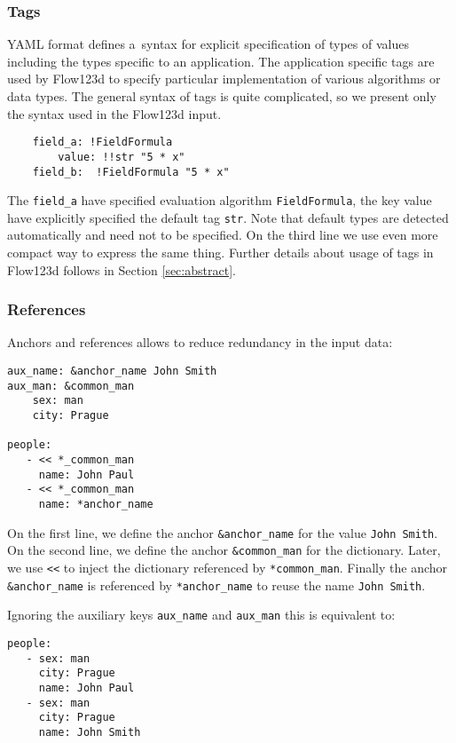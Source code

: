 \subsubsection{Tags}
YAML format defines a~syntax for explicit specification of types of values including the types specific to an application.
The application specific tags are used by Flow123d to specify particular implementation of various algorithms or data types.
The general syntax of tags is quite complicated, so we present only the syntax used in the Flow123d input.
\begin{verbatim}
    field_a: !FieldFormula
        value: !!str "5 * x" 
    field_b:  !FieldFormula "5 * x"   
\end{verbatim}

The \verb'field_a' have specified evaluation algorithm \verb'FieldFormula', the key value have explicitly specified the default tag \verb'str'.
Note that default types are detected automatically and need not to be specified. On the third line we use even more compact way to 
express the same thing. Further details about usage of tags in Flow123d follows in Section \ref{sec:abstract}.

\subsubsection{References}
Anchors and references allows to reduce redundancy in the input data:
\begin{verbatim}
aux_name: &anchor_name John Smith
aux_man: &common_man
    sex: man
    city: Prague
    
people:
   - << *_common_man
     name: John Paul
   - << *_common_man
     name: *anchor_name
\end{verbatim}
On the first line, we define the anchor \verb'&anchor_name' for the value \verb'John Smith'. On the second line, 
we define the anchor \verb'&common_man' for the dictionary. Later, we use \verb'<<' to inject the dictionary 
referenced by \verb'*common_man'. Finally the anchor \verb'&anchor_name' is referenced by \verb'*anchor_name' to reuse the 
name \verb'John Smith'.

Ignoring the auxiliary keys \verb'aux_name' and \verb'aux_man' this is equivalent to:
\begin{verbatim}
people:
   - sex: man
     city: Prague
     name: John Paul
   - sex: man
     city: Prague
     name: John Smith
\end{verbatim}


